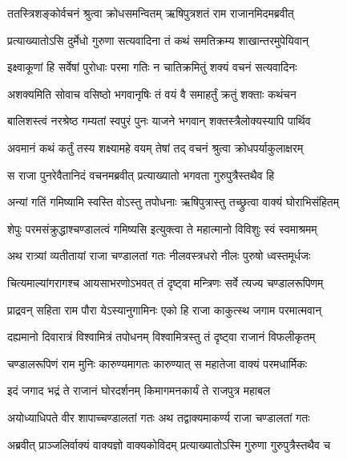 
\twolineshloka
{ततस्त्रिशङ्कोर्वचनं श्रुत्वा क्रोधसमन्वितम्}
{ऋषिपुत्रशतं राम राजानमिदमब्रवीत्} %

\twolineshloka
{प्रत्याख्यातोऽसि दुर्मेधो गुरुणा सत्यवादिना}
{तं कथं समतिक्रम्य शाखान्तरमुपेयिवान्} %

\twolineshloka
{इक्ष्वाकूणां हि सर्वेषां पुरोधाः परमा गतिः}
{न चातिक्रमितुं शक्यं वचनं सत्यवादिनः} %

\twolineshloka
{अशक्यमिति सोवाच वसिष्ठो भगवानृषिः}
{तं वयं वै समाहर्तुं क्रतुं शक्ताः कथंचन} %

\twolineshloka
{बालिशस्त्वं नरश्रेष्ठ गम्यतां स्वपुरं पुनः}
{याजने भगवान् शक्तस्त्रैलोक्यस्यापि पार्थिव} %

\twolineshloka
{अवमानं कथं कर्तुं तस्य शक्ष्यामहे वयम्}
{तेषां तद् वचनं श्रुत्वा क्रोधपर्याकुलाक्षरम्} %

\twolineshloka
{स राजा पुनरेवैतानिदं वचनमब्रवीत्}
{प्रत्याख्यातो भगवता गुरुपुत्रैस्तथैव हि} %

\twolineshloka
{अन्यां गतिं गमिष्यामि स्वस्ति वोऽस्तु तपोधनाः}
{ऋषिपुत्रास्तु तच्छ्रुत्वा वाक्यं घोराभिसंहितम्} %

\twolineshloka
{शेपुः परमसंक्रुद्धाश्चण्डालत्वं गमिष्यसि}
{इत्युक्त्वा ते महात्मानो विविशुः स्वं स्वमाश्रमम्} %

\twolineshloka
{अथ रात्र्यां व्यतीतायां राजा चण्डालतां गतः}
{नीलवस्त्रधरो नीलः पुरुषो ध्वस्तमूर्धजः} %

\twolineshloka
{चित्यमाल्यांगरागश्च आयसाभरणोऽभवत्}
{तं दृष्ट्वा मन्त्रिणः सर्वे त्यज्य चण्डालरूपिणम्} %

\twolineshloka
{प्राद्रवन् सहिता राम पौरा येऽस्यानुगामिनः}
{एको हि राजा काकुत्स्थ जगाम परमात्मवान्} %

\twolineshloka
{दह्यमानो दिवारात्रं विश्वामित्रं तपोधनम्}
{विश्वामित्रस्तु तं दृष्ट्वा राजानं विफलीकृतम्} %

\twolineshloka
{चण्डालरूपिणं राम मुनिः कारुण्यमागतः}
{कारुण्यात् स महातेजा वाक्यं परमधार्मिकः} %

\twolineshloka
{इदं जगाद भद्रं ते राजानं घोरदर्शनम्}
{किमागमनकार्यं ते राजपुत्र महाबल} %

\twolineshloka
{अयोध्याधिपते वीर शापाच्चण्डालतां गतः}
{अथ तद्वाक्यमाकर्ण्य राजा चण्डालतां गतः} %

\twolineshloka
{अब्रवीत् प्राञ्जलिर्वाक्यं वाक्यज्ञो वाक्यकोविदम्}
{प्रत्याख्यातोऽस्मि गुरुणा गुरुपुत्रैस्तथैव च} %

